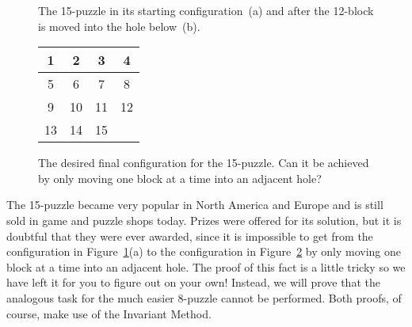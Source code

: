 \begin{figure}
\centering



\caption{The 15-puzzle in its starting configuration~(a) and after the
12-block is moved into the hole below~(b).}
\label{fig:15puzzle}
\end{figure}

\begin{figure}

\begin{center}
\begin{tabular}{|c|c|c|c|}
\hline
1 & 2 & 3 & 4 \\\hline
5 & 6 & 7 & 8 \\\hline
9 & 10 & 11 & 12 \\\hline
13 & 14 & 15 &  \\\hline
\end{tabular}
\end{center}

\caption{The desired final configuration for the 15-puzzle.  Can it be
  achieved by only moving one block at a time into an adjacent hole?}
\label{fig:15puzzlesolved}
\end{figure}

The 15-puzzle became very popular in North America and Europe and is
still sold in game and puzzle shops today.  Prizes were offered for
its solution, but it is doubtful that they were ever awarded, since it
is impossible to get from the configuration in
Figure~\ref{fig:15puzzle}(a) to the configuration in
Figure~\ref{fig:15puzzlesolved} by only moving one block at a time
into an adjacent hole.  The proof of this fact is a little tricky so
we have left it for you to figure out on your own!  Instead, we will
prove that the analogous task for the much easier 8-puzzle cannot be
performed.  Both proofs, of course, make use of the Invariant Method.

